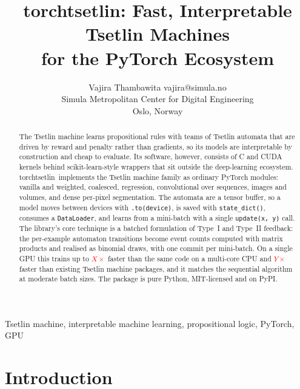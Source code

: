 \documentclass[twoside,11pt]{article}
\newcommand{\res}[1]{\textcolor{red}{#1}}
\newcommand{\code}[1]{\texttt{#1}}
\newcommand{\lib}{\textsf{torchtsetlin}}
\begin{document}
\title{torchtsetlin: Fast, Interpretable Tsetlin Machines\\ for the PyTorch Ecosystem}

\author{\name Vajira Thambawita \email vajira@simula.no \\
       \addr Simula Metropolitan Center for Digital Engineering\\
       Oslo, Norway}


\maketitle

\begin{abstract}%
The Tsetlin machine learns propositional rules with teams of Tsetlin automata that are driven
by reward and penalty rather than gradients, so its models are interpretable by construction and
cheap to evaluate. Its software, however, consists of C and CUDA kernels behind
scikit-learn-style wrappers that sit outside the deep-learning ecosystem. \lib\ implements
the Tsetlin machine family as ordinary PyTorch modules: vanilla and weighted, coalesced,
regression, convolutional over sequences, images and volumes, and dense per-pixel segmentation.
The automata are a tensor buffer, so a model moves between devices with \code{.to(device)},
is saved with \code{state\_dict()}, consumes a \code{DataLoader}, and learns from a mini-batch
with a single \code{update(x, y)} call. The library's core technique is a batched formulation of
Type~I and Type~II feedback: the per-example automaton transitions become event counts computed
with matrix products and realised as binomial draws, with one commit per mini-batch. On a
single GPU this trains up to \res{$X\times$} faster than the same code on a multi-core CPU and
\res{$Y\times$} faster than existing Tsetlin machine packages, and it matches the sequential
algorithm at moderate batch sizes. The package is pure Python, MIT-licensed and on PyPI.
\end{abstract}

\begin{keywords}
  Tsetlin machine, interpretable machine learning, propositional logic, PyTorch, GPU
\end{keywords}

\section{Introduction}
\label{sec:intro}
\end{document}
